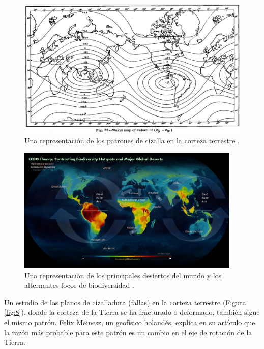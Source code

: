 \documentclass[10pt,twocolumn,letterpaper]{article}
\begin{document}
\begin{figure}[t]
\begin{center}
   \includegraphics[width=1\linewidth]{meinesz3.jpg}
\end{center}
   \caption{Una representación de los patrones de cizalla en la corteza terrestre \cite{36}.}
\label{fig:8}
\label{fig:onecol}
\end{figure}
\begin{figure}[t]
\begin{center}
\includegraphics[width=0.95\textwidth]{biodiversity.jpg}
\end{center}
   \caption{Una representación de los principales desiertos del mundo y los alternantes focos de biodiversidad \cite{28}.}
\label{fig:9}
\end{figure}

Un estudio de los planos de cizalladura (fallas) en la corteza terrestre (Figura \ref{fig:8}), donde la corteza de la Tierra se ha fracturado o deformado, también sigue el mismo patrón. Felix Meinesz, un geofísico holandés, explica en su artículo \cite{36} que la razón más probable para este patrón es un cambio en el eje de rotación de la Tierra.
\end{document}
